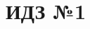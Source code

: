 \documentclass{article}
\title{\vspace{-1cm}ИДЗ №1}
\begin{document}
	\begin{enumerate}
	\end{enumerate}
\end{document}
